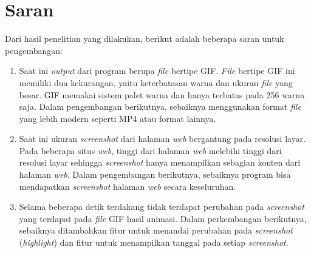 \section{Saran}
\label{sec:saran}
Dari hasil penelitian yang dilakukan, berikut adalah beberapa saran untuk pengembangan:
\begin{enumerate}
\item Saat ini \textit{output} dari program berupa \textit{file} bertipe GIF. \textit{File} bertipe GIF ini memiliki dua kekurangan, yaitu keterbatasan warna dan ukuran \textit{file} yang besar. GIF memakai sistem palet warna dan hanya terbatas pada 256 warna saja. Dalam pengembangan berikutnya, sebaiknya menggunakan format \textit{file} yang lebih modern seperti MP4 atau format lainnya. 


 
\item Saat ini ukuran \textit{screenshot} dari halaman \textit{web} bergantung pada resolusi layar. Pada beberapa situs \textit{web}, tinggi dari halaman \textit{web} melebihi tinggi dari resolusi layar sehingga \textit{screenshot} hanya menampilkan sebagian konten dari halaman \textit{web}. Dalam pengembangan berikutnya, sebaiknya program bisa mendapatkan \textit{screenshot} halaman \textit{web} secara keseluruhan.  

\item Selama beberapa detik terdakang tidak terdapat perubahan pada \textit{screenshot} yang terdapat pada \textit{file} GIF hasil animasi. Dalam perkembangan berikutnya, sebaiknya ditambahkan fitur untuk menandai perubahan pada \textit{screenshot} (\textit{highlight}) dan fitur untuk menampilkan tanggal pada setiap \textit{screenshot}. 


 
\end{enumerate}